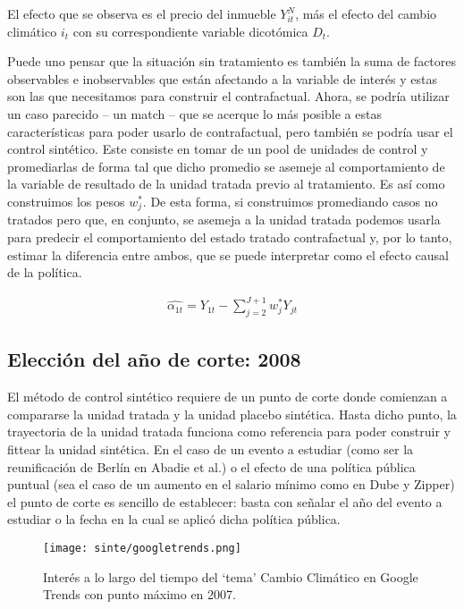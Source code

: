 \documentclass[12pt]{article}
\begin{document}
El efecto que se observa es el precio del inmueble {$Y_{it}^{N}$}, más el efecto del cambio climático {$i_t$} con su correspondiente variable dicotómica {$D_t$}.

Puede uno pensar que la situación sin tratamiento es también la suma de factores observables e inobservables que están afectando a la variable de interés y estas son las que necesitamos para construir el contrafactual. Ahora, se podría utilizar un caso parecido – un match – que se acerque lo más posible a estas características para poder usarlo de contrafactual, pero también se podría usar el control sintético. Este consiste en tomar de un pool de unidades de control y promediarlas de forma tal que dicho promedio se asemeje al comportamiento de la variable de resultado de la unidad tratada previo al tratamiento. Es así como construimos los pesos {$w_j^*$}. De esta forma, si construimos promediando casos no tratados pero que, en conjunto, se asemeja a la unidad tratada podemos usarla para predecir el comportamiento del estado tratado contrafactual y, por lo tanto, estimar la diferencia entre ambos, que se puede interpretar como el efecto causal de la política.

\begin{align*}
    \hat{\alpha_{1t}} = Y_{1t} - \sum_{j=2}^{J+1}{w_{j}^{*}Y_{jt}}
\end{align*}

\subsection{Elección del año de corte: 2008}
El método de control sintético requiere de un punto de corte donde comienzan a compararse la unidad tratada y la unidad placebo sintética. Hasta dicho punto, la trayectoria de la unidad tratada funciona como referencia para poder construir y fittear la unidad sintética. En el caso de un evento a estudiar (como ser la reunificación de Berlín en Abadie et al.) o el efecto de una política pública puntual (sea el caso de un aumento en el salario mínimo como en Dube y Zipper) el punto de corte es sencillo de establecer: basta con señalar el año del evento a estudiar o la fecha en la cual se aplicó dicha política pública.

\begin{figure}[H]
\centering
\texttt{[image: sinte/googletrends.png]}
\caption*{Interés a lo largo del tiempo del ‘tema’ Cambio Climático en Google Trends con punto máximo en 2007.}
\end{figure}
\end{document}

